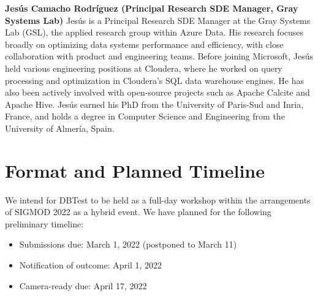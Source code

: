 \documentclass[sigconf]{acmart}
\begin{document}
\textbf{Jesús Camacho Rodríguez (Principal Research SDE Manager, Gray Systems Lab)}
Jesús is a Principal Research SDE Manager at the Gray Systems Lab (GSL), the applied research group within Azure Data. His research focuses broadly on optimizing data systems performance and efficiency, with close collaboration with product and engineering teams.
Before joining Microsoft, Jesús held various engineering positions at Cloudera, where he worked on query processing and optimization in Cloudera’s SQL data warehouse engines. He has also been actively involved with open-source projects such as Apache Calcite and Apache Hive.
Jesús earned his PhD from the University of Paris-Sud and Inria, France, and holds a degree in Computer Science and Engineering from the University of Almería, Spain.

\section{Format and Planned Timeline}

We intend for DBTest to be held as a full-day workshop within the arrangements of SIGMOD 2022 as a hybrid event.
We have planned for the following preliminary timeline:
\begin{itemize}
    \item Submissions due: March 1, 2022 (postponed to March 11)
    \item Notification of outcome: April 1, 2022
    \item Camera-ready due: April 17, 2022
\end{itemize}
\end{document}
